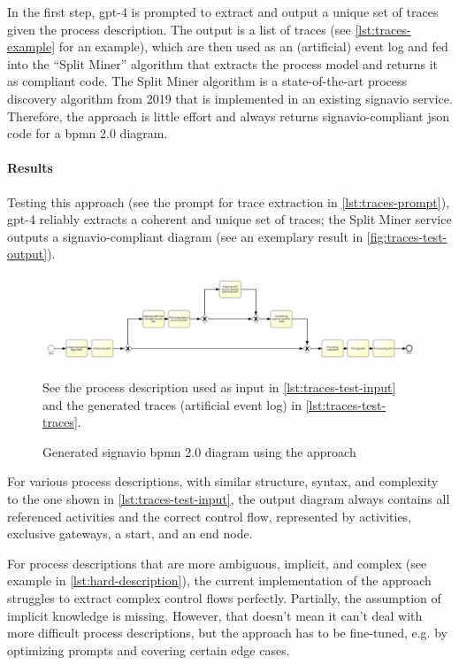In the first step, \acs{gpt}-4 is prompted to extract and output a unique set of \glspl{trace} given the process description. The output is a list of \glspl{trace} (see \autoref{lst:traces-example} for an example), which are then used as an (artificial) \gls{event log} and fed into the ``Split Miner'' \citep{split-miner} algorithm that extracts the process model and returns it as compliant code. The Split Miner algorithm is a state-of-the-art \gls{process discovery algorithm} from 2019 that is implemented in an existing \gls{signavio} service. Therefore, the approach is little effort and always returns \gls{signavio}-compliant \acs{json} code for a \acs{bpmn} 2.0 diagram.

\paragraph{Results}Testing this approach (see the prompt for \gls{trace} extraction in \autoref{lst:traces-prompt}), \acs{gpt}-4 reliably extracts a coherent and unique set of \glspl{trace}; the Split Miner service outputs a \gls{signavio}-compliant diagram (see an exemplary result in \autoref{fig:traces-test-output}).

\begin{figure}[h]
    \centering
    \includegraphics[width=\textwidth,height=\textheight,keepaspectratio]{../assets/images/Traces Test Output.png}
    \caption{Generated \gls{signavio} \acs{bpmn} 2.0 diagram using the  approach}
    \label{fig:traces-test-output}

    \medskip
    \small
    See the process description used as input in \autoref{lst:traces-test-input} and the generated \glspl{trace} (artificial \gls{event log}) in \autoref{lst:traces-test-traces}.
\end{figure}

For various process descriptions, with similar structure, syntax, and complexity to the one shown in \autoref{lst:traces-test-input}, the output diagram always contains all referenced activities and the correct control flow, represented by activities, exclusive gateways, a start, and an end node.

For process descriptions that are more ambiguous, implicit, and complex (see example in \autoref{lst:hard-description}), the current implementation of the approach struggles to extract complex control flows perfectly. Partially, the assumption of implicit knowledge is missing. However, that doesn't mean it can't deal with more difficult process descriptions, but the approach has to be fine-tuned, e.g. by optimizing prompts and covering certain edge cases.


